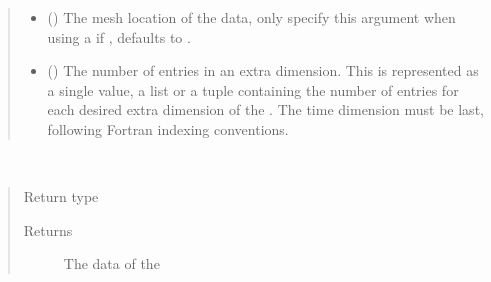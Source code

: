 \documentclass[letterpaper,10pt,english]{sphinxmanual}
\begin{document}
\begin{fulllineitems}
\begin{quote}
\begin{description}
\begin{itemize}
\item {} 
 ({\hyperref[\detokenize{MeshLoc:ESMF.api.constants.MeshLoc}]{}}) \textendash{} The mesh location of the
{\hyperref[\detokenize{field:ESMF.api.field.Field}]{}} data, only specify this argument when
using a {\hyperref[\detokenize{mesh:ESMF.api.mesh.Mesh}]{}}
if , defaults to {\hyperref[\detokenize{MeshLoc:ESMF.api.constants.MeshLoc.NODE}]{}}.

\item {} 
 () \textendash{} The number of entries in an extra
{\hyperref[\detokenize{field:ESMF.api.field.Field}]{}} dimension. This is represented as a
single value, a list or a tuple containing the number of entries for
each desired extra dimension of the {\hyperref[\detokenize{field:ESMF.api.field.Field}]{}}. The
time dimension must be last, following Fortran indexing conventions.

\end{itemize}

\end{description}\end{quote}

\begin{fulllineitems}
\label{\detokenize{field:ESMF.api.field.Field.data}}~\begin{quote}\begin{description}
\item[{Return type}] \leavevmode
{\hyperref[\detokenize{TypeKind:ESMF.api.constants.TypeKind}]{}}

\item[{Returns}] \leavevmode
The data of the {\hyperref[\detokenize{field:ESMF.api.field.Field}]{}}

\end{description}\end{quote}


\end{fulllineitems}
\end{fulllineitems}
\end{document}
